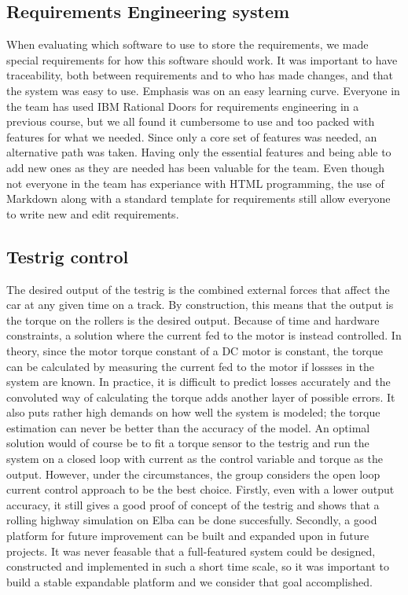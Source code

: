 \subsection{Requirements Engineering system}
When evaluating which software to use to store the requirements, we made
special requirements for how this software should work. It was important to have
traceability, both between requirements and to who has made changes, and that
the system was easy to use. Emphasis was on an easy learning curve. Everyone in
the team has used IBM Rational Doors for requirements engineering in a previous
course, but we all found it cumbersome to use and too packed with features for
what we needed. Since only a core set of features was needed, an alternative
path was taken. Having only the essential features and being able to add new
ones as they are needed has been valuable for the team. Even though not everyone
in the team has experiance with HTML programming, the use of Markdown along with
a standard template for requirements still allow everyone to write new and edit
requirements. 

\subsection{Testrig control}
The desired output of the testrig is the combined external forces that affect
the car at any given time on a track. By construction, this means that the
output is the torque on the rollers is the desired output. Because of time
and hardware constraints, a solution where the current fed to the motor is
instead controlled. In theory, since the motor torque constant of a DC motor is
constant, the torque can be calculated by measuring the current fed to the
motor if lossses in the system are known. In practice, it is difficult to
predict losses accurately and the convoluted way of calculating the torque adds
another layer of possible errors. It also puts rather high demands on how well
the system is modeled; the torque estimation can never be better than the
accuracy of the model. An optimal solution would of course be to fit a torque
sensor to the testrig and run the system on a closed loop with current as the
control variable and torque as the output. However, under the
circumstances, the group considers the open loop current control approach to be
the best choice. Firstly, even with a lower output accuracy, it still gives a
good proof of concept of the testrig and shows that a rolling highway simulation
on Elba can be done succesfully. Secondly, a good platform for future
improvement can be built and expanded upon in future projects. It was never
feasable that a full-featured system could be designed, constructed and
implemented in such a short time scale, so it was important to build a stable
expandable platform and we consider that goal accomplished.

